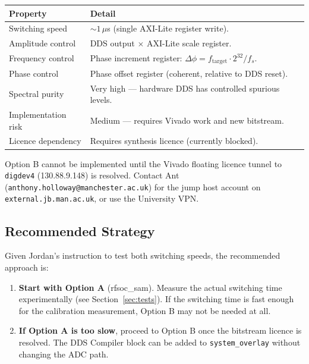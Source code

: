 \documentclass[11pt,a4paper]{article}
\newenvironment{warnbox}{\begin{tcolorbox}[enhanced,colback=warnbg,colframe=warnborder,
  left=5pt,right=5pt,top=3pt,bottom=3pt,
  before upper={\small\textbf{\color{warnborder}WARNING:\enspace}}]}{\end{tcolorbox}}
\begin{document}
\begin{center}
\begin{tabular}{L{3.5cm} L{9.5cm}}
\toprule
\textbf{Property} & \textbf{Detail} \\
\midrule
Switching speed    & $\sim 1$\,$\mu$s (single AXI-Lite register write). \\
Amplitude control  & DDS output $\times$ AXI-Lite scale register. \\
Frequency control  & Phase increment register: $\Delta\phi = f_{\text{target}} \cdot 2^{32} / f_s$. \\
Phase control      & Phase offset register (coherent, relative to DDS reset). \\
Spectral purity    & Very high --- hardware DDS has controlled spurious levels. \\
Implementation risk & Medium --- requires Vivado work and new bitstream. \\
Licence dependency & Requires synthesis licence (currently blocked). \\
\bottomrule
\end{tabular}
\end{center}

\begin{warnbox}
Option B cannot be implemented until the Vivado floating licence tunnel to
\texttt{digdev4} (130.88.9.148) is resolved. Contact Ant
(\texttt{anthony.holloway@manchester.ac.uk}) for the jump host account on
\texttt{external.jb.man.ac.uk}, or use the University VPN.
\end{warnbox}

\subsection{Recommended Strategy}

Given Jordan's instruction to test both switching speeds, the recommended approach is:

\begin{enumerate}[leftmargin=2em,itemsep=4pt]
  \item \textbf{Start with Option A} (rfsoc\_sam). Measure the actual switching time
        experimentally (see Section~\ref{sec:tests}). If the switching time is fast
        enough for the calibration measurement, Option B may not be needed at all.
  \item \textbf{If Option A is too slow}, proceed to Option B once the bitstream
        licence is resolved. The DDS Compiler block can be added to
        \texttt{system\_overlay} without changing the ADC path.
\end{enumerate}
\end{document}

